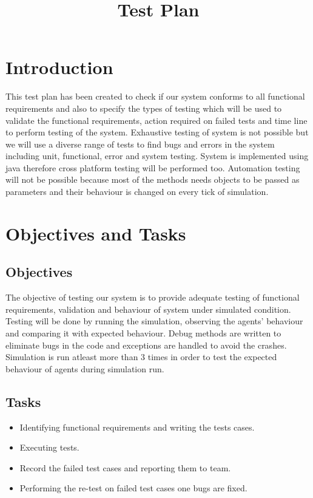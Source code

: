 \documentclass[11pt, oneside]{article}   	%
\title{Test Plan}
\author{}
\begin{document}
\maketitle
\section{Introduction}
This test plan has been created to check if our system conforms to all functional requirements and also to specify the types of testing which will be used to validate the functional requirements, action required on failed tests and time line to perform testing of the system. Exhaustive testing of system is not possible but we will use a diverse range of tests to find bugs and errors in the system including unit, functional, error and system testing. System is implemented using java therefore cross platform testing will be performed too. Automation testing will not be possible because most of the methods needs objects to be passed as parameters and their behaviour is changed on every tick of simulation. 

\section{Objectives and Tasks}
\subsection{Objectives}
    The objective of testing our system is to provide adequate testing of functional requirements, validation and behaviour of system under simulated condition. Testing will be done by running the simulation, observing the agents' behaviour and comparing it with expected behaviour. Debug methods are written to eliminate bugs in the code and exceptions are handled to avoid the crashes. Simulation is run atleast more than 3 times in order to test the expected behaviour of agents during simulation run.

\subsection{Tasks}
\begin{itemize}
	\item Identifying functional requirements and writing the tests cases.

	\item Executing tests.

	\item Record the failed test cases and reporting them to team.

	\item Performing the re-test on failed test cases one bugs are fixed.
\end{itemize}
\end{document}
